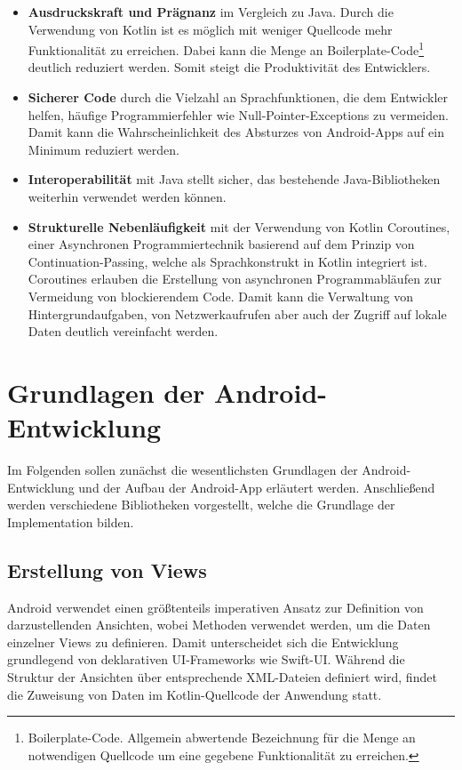 \begin{itemize}
    \item \textbf{Ausdruckskraft und Prägnanz} im Vergleich zu Java. Durch die Verwendung von Kotlin ist es möglich mit weniger Quellcode mehr Funktionalität zu erreichen. Dabei kann die Menge an Boilerplate-Code\footnote{Boilerplate-Code. Allgemein abwertende Bezeichnung für die Menge an notwendigen Quellcode um eine gegebene Funktionalität zu erreichen.} deutlich reduziert werden. Somit steigt die Produktivität des Entwicklers.
    \item \textbf{Sicherer Code} durch die Vielzahl an Sprachfunktionen, die dem Entwickler helfen, häufige Programmierfehler wie Null-Pointer-Exceptions zu vermeiden. Damit kann die Wahrscheinlichkeit des Absturzes von Android-Apps auf ein Minimum reduziert werden. \newpage
    \item \textbf{Interoperabilität} mit Java stellt sicher, das bestehende Java-Bibliotheken weiterhin verwendet werden können.
    \item \textbf{Strukturelle Nebenläufigkeit} mit der Verwendung von Kotlin Coroutines, einer Asynchronen Programmiertechnik basierend auf dem Prinzip von Continuation-Passing, welche als Sprachkonstrukt in Kotlin integriert ist. Coroutines erlauben die Erstellung von asynchronen Programmabläufen zur Vermeidung von blockierendem Code. Damit kann die Verwaltung von Hintergrundaufgaben, von Netzwerkaufrufen aber auch der Zugriff auf lokale Daten deutlich vereinfacht werden.    
  \end{itemize}

\section{Grundlagen der Android-Entwicklung}\label{sec:android-basics}

Im Folgenden sollen zunächst die wesentlichsten Grundlagen der Android-Entwicklung und der Aufbau der Android-App erläutert werden. Anschließend werden verschiedene Bibliotheken vorgestellt, welche die Grundlage der Implementation bilden.

\subsection{Erstellung von Views}\label{subsec:view-creation}

Android verwendet einen größtenteils imperativen Ansatz zur Definition von darzustellenden Ansichten, wobei Methoden verwendet werden, um die Daten einzelner Views zu definieren. Damit unterscheidet sich die Entwicklung grundlegend von deklarativen UI-Frameworks wie Swift-UI. Während die Struktur der Ansichten über entsprechende XML-Dateien definiert wird, findet die Zuweisung von Daten im Kotlin-Quellcode der Anwendung statt.

